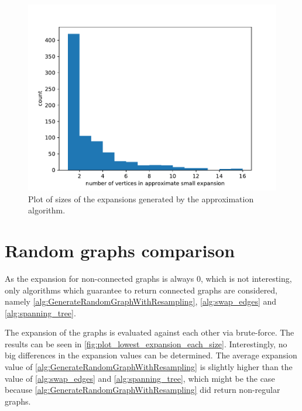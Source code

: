 
\begin{figure}
	\centering
	\includegraphics[scale=1]{figures/quality_evaluation_log_small_expansion_sizes.pdf}
	\caption[Plot sizes small expansions]{Plot of sizes of the expansions generated by the approximation algorithm.\label{fig:sizes_small_expansions}}
\end{figure}


\section{Random graphs comparison}
As the expansion for non-connected graphs is always $0$, which is not interesting, only algorithms which guarantee to return connected graphs are considered, namely \ref{alg:GenerateRandomGraphWithResampling}, \ref{alg:swap_edges} and \ref{alg:spanning_tree}.

The expansion of the graphs is evaluated against each other via brute-force. The results can be seen in \cref{fig:plot_lowest_expansion_each_size}. Interestingly, no big differences in the expansion values can be determined. The average expansion value of \ref{alg:GenerateRandomGraphWithResampling} is slightly higher than the value of \ref{alg:swap_edges} and \ref{alg:spanning_tree}, which might be the case because \ref{alg:GenerateRandomGraphWithResampling} did return non-regular graphs.

